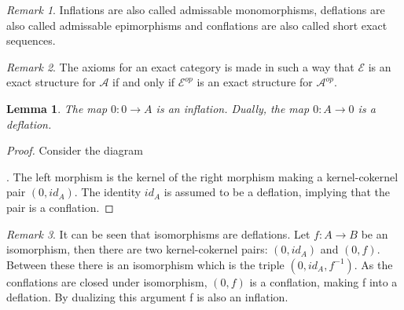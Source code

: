 \documentclass[12pt]{article}
\newtheorem{lemma}[theorem]{Lemma}
\theoremstyle{definition}
\theoremstyle{remark}
\newtheorem*{remark}{Remark}
\begin{document}
            \begin{remark}
                Inflations are also called admissable monomorphisms, deflations are also called admissable epimorphisms and conflations are also called short exact sequences.
            \end{remark}

            \begin{remark}
                The axioms for an exact category is made in such a way that $\mathcal{E}$ is an exact structure for $\mathcal{A}$ if and only if $\mathcal{E}^{op}$ is an exact structure for $\mathcal{A}^{op}$.
            \end{remark}

            \begin{lemma}
                The map $0:0\rightarrow A$ is an inflation. Dually, the map $0:A\rightarrow 0$ is a deflation.
            \end{lemma}

            \begin{proof}
                Consider the diagram . The left morphism is the kernel of the right morphism making a kernel-cokernel pair $(0,id_A)$. The identity $id_A$ is assumed to be a deflation, implying that the pair is a conflation.
            \end{proof}

            \begin{remark}
                It can be seen that isomorphisms are deflations. Let $f:A\rightarrow B$ be an isomorphism, then there are two kernel-cokernel pairs: $(0,id_A)$ and $(0,f)$. Between these there is an isomorphism which is the triple $(0,id_A,f^{-1})$. As the conflations are closed under isomorphism, $(0,f)$ is a conflation, making f into a deflation. By dualizing this argument f is also an inflation.
                \begin{center}
                \end{center}
            \end{remark}
\end{document}
